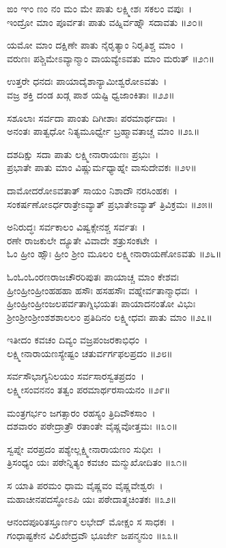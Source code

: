 ಙಂ ಞಂ ಣಂ ನಂ ಮಂ ಮೇ ಪಾತು ಲಕ್ಷ್ಮೀಶಃ ಸಕಲಂ ವಪುಃ~।\\
ಇಂದ್ರೋ ಮಾಂ ಪೂರ್ವತಃ ಪಾತು ವಹ್ನಿರ್ವಹ್ನೌ ಸದಾವತು ॥೨೦॥

ಯಮೋ ಮಾಂ ದಕ್ಷಿಣೇ ಪಾತು ನೈರೃತ್ಯಾಂ ನಿರೃತಿಶ್ಚ ಮಾಂ~।\\
ವರುಣಃ ಪಶ್ಚಿಮೇಽವ್ಯಾನ್ಮಾಂ ವಾಯವ್ಯೇಽವತು ಮಾಂ ಮರುತ್ ॥೨೧॥

ಉತ್ತರೇ ಧನದಃ ಪಾಯಾದೈಶಾನ್ಯಾಮೀಶ್ವರೋಽವತು~।\\
ವಜ್ರ ಶಕ್ತಿ ದಂಡ ಖಡ್ಗ ಪಾಶ ಯಷ್ಟಿ ಧ್ವಜಾಂಕಿತಾಃ ॥೨೨॥

ಸಶೂಲಾಃ ಸರ್ವದಾ ಪಾಂತು ದಿಗೀಶಾಃ ಪರಮಾರ್ಥದಾಃ~।\\
ಅನಂತಃ ಪಾತ್ವಧೋ ನಿತ್ಯಮೂರ್ಧ್ವೇ ಬ್ರಹ್ಮಾವತಾಚ್ಚ ಮಾಂ ॥೨೩॥

ದಶದಿಕ್ಷು ಸದಾ ಪಾತು ಲಕ್ಷ್ಮೀನಾರಾಯಣಃ ಪ್ರಭುಃ~।\\
ಪ್ರಭಾತೇ ಪಾತು ಮಾಂ ವಿಷ್ಣುರ್ಮಧ್ಯಾಹ್ನೇ ವಾಸುದೇವಕಃ ॥೨೪॥

ದಾಮೋದರೋಽವತಾತ್ ಸಾಯಂ ನಿಶಾದೌ ನರಸಿಂಹಕಃ~।\\
ಸಂಕರ್ಷಣೋಽರ್ಧರಾತ್ರೇಽವ್ಯಾತ್ ಪ್ರಭಾತೇಽವ್ಯಾತ್ ತ್ರಿವಿಕ್ರಮಃ ॥೨೫॥

ಅನಿರುದ್ಧಃ ಸರ್ವಕಾಲಂ ವಿಷ್ವಕ್ಸೇನಶ್ಚ ಸರ್ವತಃ~।\\
ರಣೇ ರಾಜಕುಲೇ ದ್ಯೂತೇ ವಿವಾದೇ ಶತ್ರುಸಂಕಟೇ~।\\
ಓಂ ಹ್ರೀಂ ಹ್ಸೌಃ ಹ್ರೀಂ ಶ್ರೀಂ ಮೂಲಂ ಲಕ್ಷ್ಮೀನಾರಾಯಣೋಽವತು ॥೨೬॥

ಓಂಓಂಓಂರಣರಾಜಚೌರರಿಪುತಃ ಪಾಯಾಚ್ಚ ಮಾಂ ಕೇಶವಃ\\
ಹ್ರೀಂಹ್ರೀಂಹ್ರೀಂಹಹಹಾ ಹಸೌಃ ಹಸಹಸೌಃ ವಹ್ನೇರ್ವತಾನ್ಮಾಧವಃ~।\\
ಹ್ರೀಂಹ್ರೀಂಹ್ರೀಂಜಲಪರ್ವತಾಗ್ನಿಭಯತಃ ಪಾಯಾದನಂತೋ ವಿಭುಃ\\
ಶ್ರೀಂಶ್ರೀಂಶ್ರೀಂಶಶಶಾಲಲಂ ಪ್ರತಿದಿನಂ ಲಕ್ಷ್ಮೀಧವಃ ಪಾತು ಮಾಂ ॥೨೭॥

ಇತೀದಂ ಕವಚಂ ದಿವ್ಯಂ ವಜ್ರಪಂಜರಕಾಭಿಧಂ~।\\
ಲಕ್ಷ್ಮೀನಾರಾಯಣಸ್ಯೇಷ್ಟಂ ಚತುರ್ವರ್ಗಫಲಪ್ರದಂ ॥೨೮॥

ಸರ್ವಸೌಭಾಗ್ಯನಿಲಯಂ ಸರ್ವಸಾರಸ್ವತಪ್ರದಂ~।\\
ಲಕ್ಷ್ಮೀಸಂವನನಂ ತತ್ವಂ ಪರಮಾರ್ಥರಸಾಯನಂ ॥೨೯॥

ಮಂತ್ರಗರ್ಭಂ ಜಗತ್ಸಾರಂ ರಹಸ್ಯಂ ತ್ರಿದಿವೌಕಸಾಂ~।\\
ದಶವಾರಂ ಪಠೇದ್ರಾತ್ರೌ ರತಾಂತೇ ವೈಷ್ಣವೋತ್ತಮಃ ॥೩೦॥

ಸ್ವಪ್ನೇ ವರಪ್ರದಂ ಪಶ್ಯೇಲ್ಲಕ್ಷ್ಮೀನಾರಾಯಣಂ ಸುಧೀಃ~।\\
ತ್ರಿಸಂಧ್ಯಂ ಯಃ ಪಠೇನ್ನಿತ್ಯಂ ಕವಚಂ ಮನ್ಮುಖೋದಿತಂ ॥೩೧॥

ಸ ಯಾತಿ ಪರಮಂ ಧಾಮ ವೈಷ್ಣವಂ ವೈಷ್ಣವೇಶ್ವರಃ~।\\
ಮಹಾಚೀನಪದಸ್ಥೋಽಪಿ ಯಃ ಪಠೇದಾತ್ಮಚಿಂತಕಃ ॥೩೨॥

ಆನಂದಪೂರಿತಸ್ತೂರ್ಣಂ ಲಭೇದ್ ಮೋಕ್ಷಂ ಸ ಸಾಧಕಃ~।\\
ಗಂಧಾಷ್ಟಕೇನ ವಿಲಿಖೇದ್ರವೌ ಭೂರ್ಜೇ ಜಪನ್ಮನುಂ ॥೩೩॥

